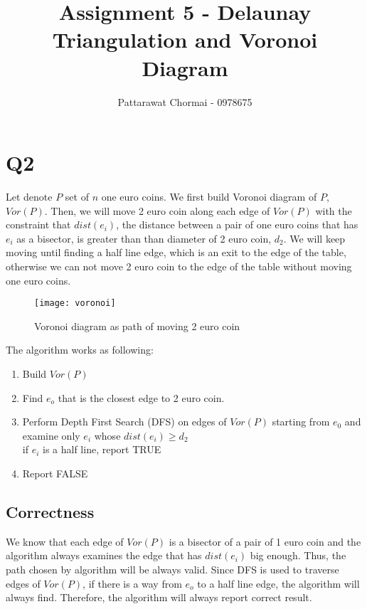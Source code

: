 \documentclass[12pt]{article}
\begin{document}
\title{Assignment 5 - Delaunay Triangulation and Voronoi Diagram }
\author{
	Pattarawat Chormai - 0978675 \\
}
\maketitle

\section*{Q2}
Let denote $P$ set of $n$ one euro coins. We first build Voronoi diagram of $P$, $Vor(P)$.
Then, we will move 2 euro coin along each edge of $Vor(P)$ with the constraint that $dist(e_i)$, the distance between a pair
of one euro coins that has $e_i$ as a bisector, is greater than than diameter of 2 euro coin,
$d_{2}$.
We will keep moving until finding a half line edge, which is an exit to the edge of the table,
otherwise we can not move 2 euro coin to the edge of the table without moving one euro coins.

\begin{center}
    \label{figure1}
    \begin{figure}[h]
    \centering
    \texttt{[image: voronoi]}\\
    \caption{Voronoi diagram as path of moving 2 euro coin } \label{fig:voronoi}
    \end{figure}
\end{center}

The algorithm works as following:
\begin{enumerate}
    \item Build $Vor(P)$
    \item Find $e_o$ that is the closest edge to 2 euro coin.
    \item Perform Depth First Search (DFS) on edges of $Vor(P)$ starting from $e_0$ and examine only $e_i$ whose $dist(e_i) \ge d_2$ \\
       if $e_i$ is a half line, report TRUE
    \item Report FALSE
\end{enumerate}


\subsection*{Correctness}
We know that each edge of $Vor(P)$ is a bisector of a pair of 1 euro coin and the algorithm
always examines the edge that has $dist(e_i)$ big enough. Thus, the path chosen by algorithm
will be always valid. Since DFS is used to traverse edges of $Vor(P)$, if there is a way
from $e_o$ to a half line edge, the algorithm will always find. Therefore, the algorithm
will always report correct result.
\end{document}
